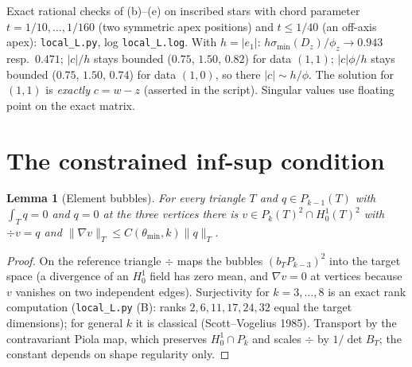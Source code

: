 \documentclass[11pt]{article}
\newtheorem{lemma}[theorem]{Lemma}
\theoremstyle{remark}
\newcommand{\norm}[1]{\|#1\|}
\begin{document}
Exact rational checks of (b)--(e) on inscribed stars with chord parameter $t=1/10,\dots,1/160$ (two symmetric apex
positions) and $t\le1/40$ (an off-axis apex): \texttt{local\_L.py}, log \texttt{local\_L.log}. With $h=|e_1|$:
$h\sigma_{\min}(D_z)/\phi_z\to0.943$ resp.\ $0.471$; $|c|/h$ stays bounded ($0.75$, $1.50$, $0.82$) for data $(1,1)$;
$|c|\phi/h$ stays bounded ($0.75$, $1.50$, $0.74$) for data $(1,0)$, so there $|c|\sim h/\phi$. The solution for $(1,1)$ is
\emph{exactly} $c=w-z$ (asserted in the script). Singular values use floating point on the exact matrix.

\section{The constrained inf-sup condition}
\begin{lemma}[Element bubbles]\label{lem:bubble}
For every triangle $T$ and $q\in P_{k-1}(T)$ with $\int_Tq=0$ and $q=0$ at the three vertices there is
$v\in P_k(T)^2\cap H^1_0(T)^2$ with $\div v=q$ and $\norm{\nabla v}_T\le C(\theta_{\min},k)\norm q_T$.
\end{lemma}
\begin{proof}
On the reference triangle $\div$ maps the bubbles $(b_TP_{k-3})^2$ into the target space (a divergence of an
$H^1_0$ field has zero mean, and $\nabla v=0$ at vertices because $v$ vanishes on two independent edges).
Surjectivity for $k=3,\dots,8$ is an exact rank computation (\texttt{local\_L.py} (B): ranks $2,6,11,17,24,32$
equal the target dimensions); for general $k$ it is classical (Scott--Vogelius 1985). Transport by the
contravariant Piola map, which preserves $H^1_0\cap P_k$ and scales $\div$ by $1/\det B_T$; the constant depends
on shape regularity only.
\end{proof}
\end{document}
